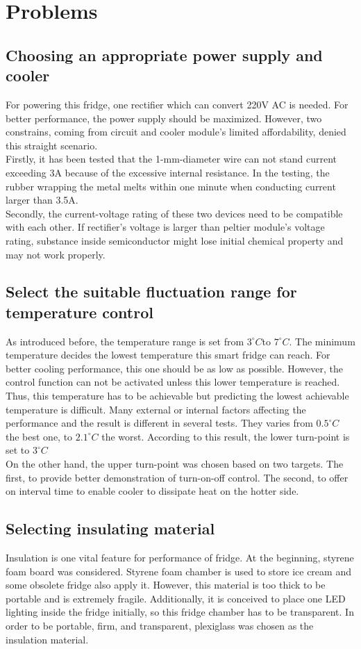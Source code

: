 \documentclass[12pt,onecolumn]{article}
\begin{document}
\section{Problems}
\subsection{Choosing an appropriate power supply and cooler}
For powering this fridge, one rectifier which can convert 220V AC is needed. For better performance, the power supply should be maximized. However, two constrains, coming from circuit and cooler module's limited affordability, denied this straight scenario. \\
Firstly, it has been tested that the 1-mm-diameter wire can not stand current exceeding 3A because of the excessive internal resistance. In the testing, the rubber wrapping the metal melts within one minute when conducting current larger than 3.5A.\\ 
Secondly, the current-voltage rating of these two devices need to be compatible with each other. If rectifier's voltage is larger than peltier module's voltage rating, substance inside semiconductor might lose initial chemical property and may not work properly. 
\subsection{Select the suitable fluctuation range for temperature control}
As introduced before, the temperature range is set from $3^{\circ}C$to $7^{\circ}C$. The minimum temperature decides the lowest temperature this smart fridge can reach. For better cooling performance, this one should be as low as possible. However, the control function can not be activated unless this lower temperature is reached. Thus, this temperature has to be achievable but predicting the lowest achievable temperature is difficult. Many external or internal factors affecting the performance and the result is different in several tests. They varies from $0.5^{\circ}C$ the best one, to $2.1^{\circ}C$ the worst. According to this result, the lower turn-point is set to $3^{\circ}C$ \\
On the other hand, the upper turn-point was chosen based on two targets. The first, to provide better demonstration of turn-on-off control. The second, to offer on interval time to enable cooler to dissipate heat on the hotter side.
\subsection{Selecting insulating material}
Insulation is one vital feature for performance of fridge. At the beginning, styrene foam board was considered. Styrene foam chamber is used to store ice cream and some obsolete fridge also apply it. However, this material is too thick to be portable and is extremely fragile. Additionally, it is conceived to place one LED lighting inside the fridge initially, so this fridge chamber has to be transparent. In order to be portable, firm, and transparent, plexiglass was chosen as the insulation material. 
\end{document}
